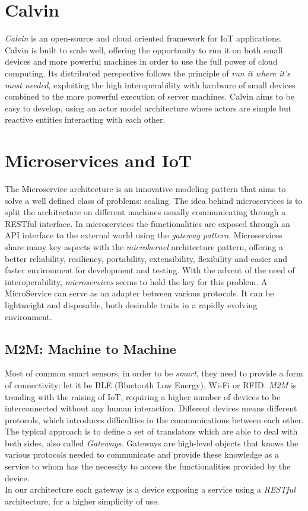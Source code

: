 \section{Calvin}

\textit{Calvin}\cite{calvin-article} is an open-source and cloud oriented framework
for IoT applications. Calvin is built to scale well, offering the opportunity
to run it on both small devices and more powerful machines in order to use the
full power of cloud computing. Its distributed perspective follows the principle
of \textit{run it where it's most needed}, exploiting the high interoperability with
hardware of small devices combined to the more powerful execution of server machines.
Calvin aims to be easy to develop, using an actor model architecture where actors are
simple but reactive entities interacting with each other.

\section{Microservices and IoT}

The Microservice architecture is an innovative modeling pattern that aims
to solve a well defined class of problems: scaling.
The idea behind microservices is to split the architecture on different machines
usually communicating through a RESTful interface.
In microservices the
functionalities are exposed through an API interface to the external world using the
\textit{gateway pattern}. Microservices share many key aspects with the \textit{microkernel}
architecture pattern, offering a better reliability, resiliency, portability, extensibility,
flexibility and easier and faster environment for development and testing.
With the advent of the need of interoperability, \textit{microservices}
seems to hold the key for this problem.
A MicroService can serve as an adapter between various protocols. It can be lightweight and disposable,
both desirable traits in a rapidly evolving environment.\cite{microiot}

\subsection{M2M: Machine to Machine}

Most of common smart sensors, in order to be \textit{smart}, they need
to provide a form of connectivity: let it be BLE (Bluetooth Low Energy),
Wi-Fi or RFID. \textit{M2M} is trending with the raising of IoT,
requiring a higher number of devices to be interconnected without
any human interaction. Different devices means different protocols,
which introduces difficulties in the communications between each other.
The typical approach is to define a set of translators which
are able to deal with both sides, also called \textit{Gateways}.
Gateways are high-level objects that knows the various protocols
needed to communicate and provide these knowledge as a service to
whom has the necessity to access the functionalities provided by the
device. \\
In our architecture each gateway is a device exposing a service using
a \textit{RESTful} architecture, for a higher simplicity of use.

